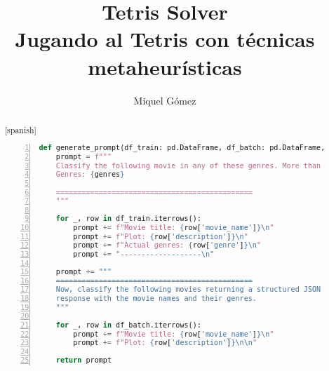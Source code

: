\documentclass[11pt,spanish,listoffigures,listoftables]{tfgetsinf}
\title{Tetris Solver \\ Jugando al Tetris con técnicas metaheurísticas}
\author{Miquel Gómez}
\begin{document}
 




\begin{abstract}[spanish]

\begin{lstlisting}[language=Python, basicstyle=\ttfamily\small, frame=single, numbers=left, breaklines=true]
def generate_prompt(df_train: pd.DataFrame, df_batch: pd.DataFrame, genres: str) -> str:
    prompt = f"""
    Classify the following movie in any of these genres. More than one genre can be assigned.
    Genres: {genres}

    ==============================================
    """

    for _, row in df_train.iterrows():
        prompt += f"Movie title: {row['movie_name']}\n"
        prompt += f"Plot: {row['description']}\n"
        prompt += f"Actual genres: {row['genre']}\n"
        prompt += "-------------------\n"

    prompt += """
    ==============================================
    Now, classify the following movies returning a structured JSON
    response with the movie names and their genres.
    """

    for _, row in df_batch.iterrows():
        prompt += f"Movie title: {row['movie_name']}\n"
        prompt += f"Plot: {row['description']}\n\n"

    return prompt
\end{lstlisting}


\end{abstract}


\clearpage
\tableofcontents
\end{document}
